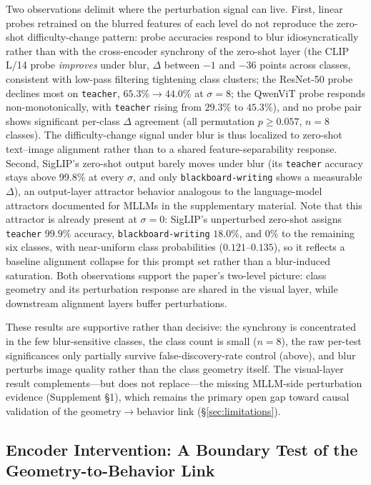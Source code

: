 \documentclass[a4paper,fleqn]{cas-sc}
\begin{document}
Two observations delimit where the perturbation signal can live. First, linear probes retrained on the blurred features of each level do not reproduce the zero-shot difficulty-change pattern: probe accuracies respond to blur idiosyncratically rather than with the cross-encoder synchrony of the zero-shot layer (the CLIP L/14 probe \emph{improves} under blur, $\Delta$ between $-1$ and $-36$ points across classes, consistent with low-pass filtering tightening class clusters; the ResNet-50 probe declines most on \texttt{teacher}, $65.3\%\rightarrow44.0\%$ at $\sigma=8$; the QwenViT probe responds non-monotonically, with \texttt{teacher} rising from $29.3\%$ to $45.3\%$), and no probe pair shows significant per-class $\Delta$ agreement (all permutation $p\geq0.057$, $n=8$ classes). The difficulty-change signal under blur is thus localized to zero-shot text--image alignment rather than to a shared feature-separability response. Second, SigLIP's zero-shot output barely moves under blur (its \texttt{teacher} accuracy stays above 99.8\% at every $\sigma$, and only \texttt{blackboard-writing} shows a measurable $\Delta$), an output-layer attractor behavior analogous to the language-model attractors documented for MLLMs in the supplementary material. Note that this attractor is already present at $\sigma=0$: SigLIP's unperturbed zero-shot assigns \texttt{teacher} $99.9\%$ accuracy, \texttt{blackboard-writing} $18.0\%$, and $0\%$ to the remaining six classes, with near-uniform class probabilities ($0.121$--$0.135$), so it reflects a baseline alignment collapse for this prompt set rather than a blur-induced saturation. Both observations support the paper's two-level picture: class geometry and its perturbation response are shared in the visual layer, while downstream alignment layers buffer perturbations.

These results are supportive rather than decisive: the synchrony is concentrated in the few blur-sensitive classes, the class count is small ($n = 8$), the raw per-test significances only partially survive false-discovery-rate control (above), and blur perturbs image quality rather than the class geometry itself. The visual-layer result complements---but does not replace---the missing MLLM-side perturbation evidence (Supplement \S1), which remains the primary open gap toward causal validation of the geometry$\rightarrow$behavior link (\S\ref{sec:limitations}).


\subsection{Encoder Intervention: A Boundary Test of the Geometry-to-Behavior Link}
\label{sec:encoderswap}
\end{document}
